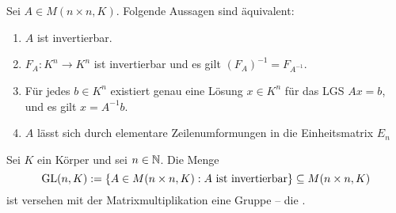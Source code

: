 \setcounter{definition}{18}
\begin{satz}
	\label{satz:I.6.19}
	Sei $A \in M(n \times n,K)$.
	Folgende Aussagen sind äquivalent:
	\begin{enumerate}[(1)]
		\item $A$ ist invertierbar.
		\item $F_A\colon K^n \rightarrow K^n$ ist invertierbar und es gilt $(F_A)^{-1} = F_{A^{-1}}$.
		\item Für jedes $b \in K^n$ existiert genau eine Lösung $x \in K^n$ für das LGS $Ax = b$, und es gilt $x = A^{-1}b$.
		\item $A$ lässt sich durch elementare Zeilenumformungen in die Einheitsmatrix $E_n$
	\end{enumerate}
\end{satz}

\setcounter{definition}{21}
\begin{definition}
	\label{def:I.6.22}
	Sei $K$ ein Körper und sei $n \in \mathbb{N}$.
	Die Menge
	\[
		\operatorname{GL}(n,K) := \{A \in M(n\times n,K) : A \text{ ist invertierbar}\} \subseteq M(n\times n,K)
	\]
	ist versehen mit der Matrixmultiplikation eine Gruppe -- die .
\end{definition}
\newpage